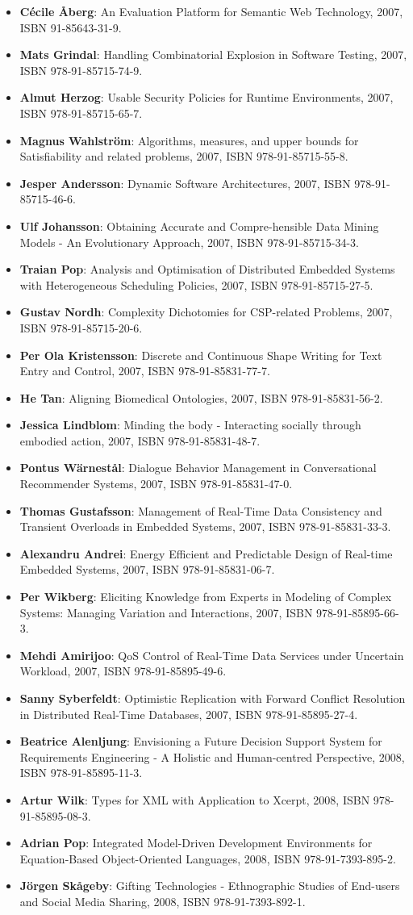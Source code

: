 \documentclass[a4paper,showtrims,twocolumn]{memoir}
\newenvironment{theses}
  {
    \begin{itemize}
      \setlength{\itemsep}{0.2em}
      \setlength{\parskip}{0em}
      \setlength{\parsep}{0em}
  }
  {
    \end{itemize}
  }
\newcommand{\thesis}[5]{\item[No. #1] \textbf{#2}: #3, #4, ISBN #5.}
\begin{document}
\begin{theses}
    \thesis{1061}{Cécile Åberg}{An Evaluation Platform for Semantic Web Technology}{2007}{91-85643-31-9}
    \thesis{1073}{Mats Grindal}{Handling Combinatorial Explosion in Software Testing}{2007}{978-91-85715-74-9}
    \thesis{1075}{Almut Herzog}{Usable Security Policies for Runtime Environments}{2007}{978-91-85715-65-7}
    \thesis{1079}{Magnus Wahlström}{Algorithms, measures, and upper bounds for Satisfiability and related problems}{2007}{978-91-85715-55-8}
    \thesis{1083}{Jesper Andersson}{Dynamic Software Architectures}{2007}{978-91-85715-46-6}
    \thesis{1086}{Ulf Johansson}{Obtaining Accurate and Compre-hensible Data Mining Models - An Evolutionary Approach}{2007}{978-91-85715-34-3}
    \thesis{1089}{Traian Pop}{Analysis and Optimisation of Distributed Embedded Systems with Heterogeneous Scheduling Policies}{2007}{978-91-85715-27-5}
    \thesis{1091}{Gustav Nordh}{Complexity Dichotomies for CSP-related Problems}{2007}{978-91-85715-20-6}
    \thesis{1106}{Per Ola Kristensson}{Discrete and Continuous Shape Writing for Text Entry and Control}{2007}{978-91-85831-77-7}
    \thesis{1110}{He Tan}{Aligning Biomedical Ontologies}{2007}{978-91-85831-56-2}
    \thesis{1112}{Jessica Lindblom}{Minding the body - Interacting socially through embodied action}{2007}{978-91-85831-48-7}
    \thesis{1113}{Pontus Wärnestål}{Dialogue Behavior Management in Conversational Recommender Systems}{2007}{978-91-85831-47-0}
    \thesis{1120}{Thomas Gustafsson}{Management of Real-Time Data Consistency and Transient Overloads in Embedded Systems}{2007}{978-91-85831-33-3}
    \thesis{1127}{Alexandru Andrei}{Energy Efficient and Predictable Design of Real-time Embedded Systems}{2007}{978-91-85831-06-7}
    \thesis{1139}{Per Wikberg}{Eliciting Knowledge from Experts in Modeling of Complex Systems: Managing Variation and Interactions}{2007}{978-91-85895-66-3}
    \thesis{1143}{Mehdi Amirijoo}{QoS Control of Real-Time Data Services under Uncertain Workload}{2007}{978-91-85895-49-6}
    \thesis{1150}{Sanny Syberfeldt}{Optimistic Replication with Forward Conflict Resolution in Distributed Real-Time Databases}{2007}{978-91-85895-27-4}
    \thesis{1155}{Beatrice Alenljung}{Envisioning a Future Decision Support System for Requirements Engineering - A Holistic and Human-centred Perspective}{2008}{978-91-85895-11-3}
    \thesis{1156}{Artur Wilk}{Types for XML with Application to Xcerpt}{2008}{978-91-85895-08-3}
    \thesis{1183}{Adrian Pop}{Integrated Model-Driven Development Environments for Equation-Based Object-Oriented Languages}{2008}{978-91-7393-895-2}
    \thesis{1185}{Jörgen Skågeby}{Gifting Technologies - Ethnographic Studies of End-users and Social Media Sharing}{2008}{978-91-7393-892-1}

\end{theses}
\end{document}
